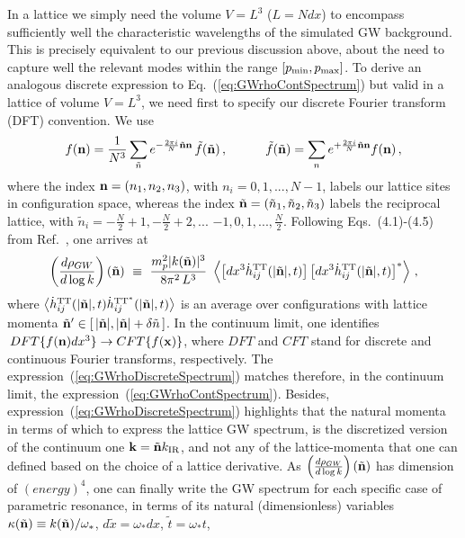 \documentclass[a4paper,11pt]{article}
\begin{document}
In a lattice we simply need the volume $V = L^3$ ($L = Ndx$) to encompass sufficiently well the characteristic wavelengths of the simulated GW background. This is precisely equivalent to our previous discussion above, about the need to capture well the relevant modes within the range $[p_{\rm min},p_{\rm max}]$. To derive an analogous discrete expression to Eq.~(\ref{eq:GWrhoContSpectrum}) but valid in a lattice of volume $V = L^3$, we need first to specify our discrete Fourier transform (DFT) convention. We use
\begin{eqnarray}
f({\bf n}) = \frac{1}{N^3}\sum_{\tilde n}e^{-\frac{2\pi i}{N}\tilde{\bf n} {\bf n}}\,\tilde f(\tilde{\bf n})\,,\hspace*{1cm} \,\tilde f(\tilde{\bf n}) = \sum_{n}e^{+\frac{2\pi i}{N}\tilde{\bf n} {\bf n}} f({\bf n})\,,
\end{eqnarray}
where the index ${\bf n} = (n_1,n_2,n_3)$, with $n_i = 0,1,...,N-1$, labels our lattice sites in configuration space, whereas the index $\tilde{\bf n} = (\tilde n_1, \tilde n_2, \tilde n_3)$ labels the reciprocal lattice, with $\tilde n_i = -\frac{N}{2}+1, -\frac{N}{2}+2,...$ $-1,0,1,..., \frac{N}{2}$. Following Eqs.~(4.1)-(4.5) from Ref.~\cite{Figueroa:2011ye}, one arrives at
\begin{equation}\label{eq:GWrhoDiscreteSpectrum}
\left(\frac{d\rho_{GW}}{d\log k}\right)(\tilde{\bf n}) ~\equiv~ \frac{m_p^2|k(\tilde{\bf n})|^3}{8\pi^2\,L^3}\,\,
\left\langle\left[dx^3\dot h_{ij}^{\rm TT}(|\tilde{\bf n}|,t)\right]\left[dx^3\dot h_{ij}^{\rm TT}(|\tilde{\bf n}|,t)\right]^*\right\rangle\,,
\end{equation} 
where $\left\langle\dot h_{ij}^{\rm TT}(|\tilde{\bf n}|,t)\dot h_{ij}^{{\rm TT}^*}(|\tilde{\bf n}|,t)\right\rangle$ is an average over configurations with lattice momenta $\tilde{\bf n}' \in [\,|\tilde{\bf n}|,|\tilde{\bf n}|+\delta\tilde n\,]$. In the continuum limit, one identifies $\,DFT\lbrace f({\bf n})dx^3 \rbrace \rightarrow CFT\lbrace f({\bf x}) \rbrace$, where $DFT$ and $CFT$ stand for discrete and continuous Fourier transforms, respectively. The expression~(\ref{eq:GWrhoDiscreteSpectrum}) matches therefore, in the continuum limit, the expression~(\ref{eq:GWrhoContSpectrum}). Besides, expression~(\ref{eq:GWrhoDiscreteSpectrum}) highlights that the natural momenta in terms of which to express the lattice GW spectrum, is the discretized version of the continuum one ${\bf k} = \tilde{\bf n} k_{\rm IR}$, and not any of the lattice-momenta that one can defined based on the choice of a lattice derivative. As $\left(\frac{d\rho_{GW}}{d\log k}\right)(\tilde{\bf n})$ has dimension of $(energy)^4$, one can finally write the GW spectrum for each specific case of parametric resonance, in terms of its natural (dimensionless) variables $\kappa(\tilde{\bf n}) \equiv k(\tilde{\bf n})/\omega_*$, $d\tilde x = \omega_*dx$, $\tilde t = \omega_* t$,
\end{document}
